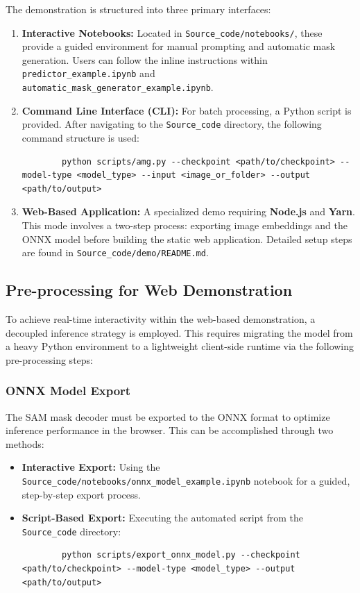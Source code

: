 The demonstration is structured into three primary interfaces:

\begin{enumerate}
	\item \textbf{Interactive Notebooks:} Located in \texttt{Source\_code/notebooks/}, these provide a guided environment for manual prompting and automatic mask generation. Users can follow the inline instructions within \texttt{predictor\_example.ipynb} and\\ \texttt{automatic\_mask\_generator\_example.ipynb}.
	
	\item \textbf{Command Line Interface (CLI):} For batch processing, a Python script is provided. After navigating to the \texttt{Source\_code} directory, the following command structure is used:
	\begin{lstlisting}
		python scripts/amg.py --checkpoint <path/to/checkpoint> --model-type <model_type> --input <image_or_folder> --output <path/to/output>
	\end{lstlisting}
	
	\item \textbf{Web-Based Application:} A specialized demo requiring \textbf{Node.js} and \textbf{Yarn}. This mode involves a two-step process: exporting image embeddings and the ONNX model before building the static web application. Detailed setup steps are found in \texttt{Source\_code/demo/README.md}.
\end{enumerate}

\subsection{Pre-processing for Web Demonstration}
To achieve real-time interactivity within the web-based demonstration, a decoupled inference strategy is employed. This requires migrating the model from a heavy Python environment to a lightweight client-side runtime via the following pre-processing steps:

\subsubsection{ONNX Model Export}
The SAM mask decoder must be exported to the ONNX format to optimize inference performance in the browser. This can be accomplished through two methods:
\begin{itemize}
	\item \textbf{Interactive Export:} Using the\\ \texttt{Source\_code/notebooks/onnx\_model\_example.ipynb} notebook for a guided, step-by-step export process.
	\item \textbf{Script-Based Export:} Executing the automated script from the \texttt{Source\_code} directory:
	\begin{lstlisting}
		python scripts/export_onnx_model.py --checkpoint <path/to/checkpoint> --model-type <model_type> --output <path/to/output>
	\end{lstlisting}
\end{itemize}

